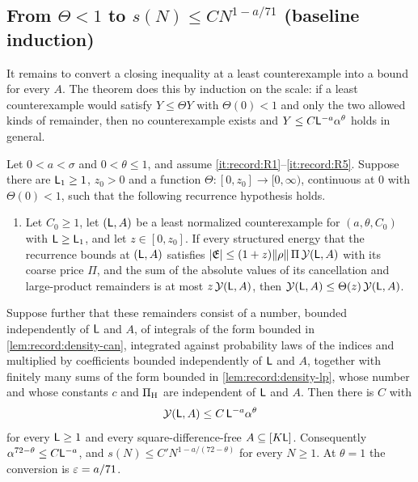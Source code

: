 \subsection{From \texorpdfstring{$\Theta<1$}{Theta<1} to \texorpdfstring{$s(N)\le CN^{1-a/71}$}{s(N) <= C N\textasciicircum (1-a/71)} (baseline induction)}\label{subsec:scale:induction}

It remains to convert a closing inequality at a least counterexample
into a bound for every $A$. The theorem does this by induction on
the scale: if a least counterexample would satisfy $Y\le\Theta Y$
with $\Theta(0)<1$ and only the two allowed kinds of remainder, then
no counterexample exists and $Y\le C\mathsf L^{-a}\alpha^\theta$ holds in
general.

\begin{theorem}\label{thm:record:lineardensity}
Let $0<a<\sigma$ and $0<\theta\le1$, and assume
\ref{it:record:R1}--\ref{it:record:R5}. Suppose there are $\mathsf L_1\ge1$,
$z_0>0$ and a function $\Theta:[0,z_0]\to[0,\infty)$, continuous at $0$ with
$\Theta(0)<1$, such that the following recurrence hypothesis holds.
\begin{enumerate}[label=(Rec)]
\item Let $C_0\ge1$, let $(\mathsf L,A)$ be a least normalized counterexample for
 $(a,\theta,C_0)$ with $\mathsf L\ge\mathsf L_1$, and let $z\in[0,z_0]$. If every
 structured energy that the recurrence bounds at $(\mathsf L,A)$ satisfies
 $|\mathfrak E|\le(1+z)\|\rho\|\,\Pi\,\mathcal Y(\mathsf L,A)$ with its coarse price $\Pi$,
 and the sum of the absolute values of its cancellation and large-product
 remainders is at most $z\,\mathcal Y(\mathsf L,A)$, then
 $\mathcal Y(\mathsf L,A)\le\Theta(z)\,\mathcal Y(\mathsf L,A)$.
\end{enumerate}
Suppose further that these remainders consist of a number, bounded
independently of $\mathsf L$ and $A$, of integrals of the form bounded in
\cref{lem:record:density-can}, integrated against probability laws of the
indices and multiplied by coefficients bounded independently of $\mathsf L$ and
$A$, together with finitely many sums of the form bounded in
\cref{lem:record:density-lp}, whose number and whose constants $c$ and
$\Pi_{\rm H}$ are independent of $\mathsf L$ and $A$. Then there is $C$
with
\[
 \mathcal Y(\mathsf L,A)\le C\,\mathsf L^{-a}\alpha^\theta
\]
for every $\mathsf L\ge1$ and every square-difference-free $A\subseteq[K\mathsf L]$.
Consequently $\alpha^{72-\theta}\le C\mathsf L^{-a}$, and
$s(N)\le C'N^{1-a/(72-\theta)}$ for every $N\ge1$. At $\theta=1$ the
conversion is $\varepsilon=a/71$.
\end{theorem}

